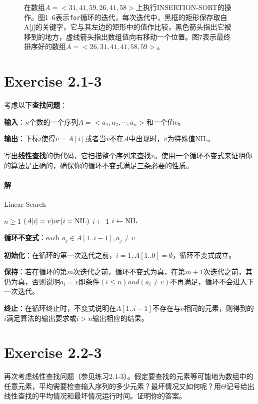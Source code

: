 \documentclass{article}
\begin{document}
\begin{figure}
\caption{在数组$A=<31,41,59,26,41,58>$上执行INSERTION-SORT的操作。图1~6表示\texttt{for}循环的迭代，每次迭代中，黑框的矩形保存取自A[j]的关键字，它与其左边的矩形中的值作比较，黑色箭头指出它被移到的地方，虚线箭头指出数组值向右移动一个位置。图7表示最终排序好的数组$A=<26,31,41,41,58,59>$。}
\label{fig:label}
\end{figure}

\section{Exercise 2.1-3}
考虑以下\textbf{查找问题}：\par
\textbf{输入}：$n$个数的一个序列$A=<a_1,a_2,\cdots,a_n>$和一个值$v$。\par
\textbf{输出}：下标$i$使得$v=A[i]$或者当$v$不在$A$中出现时，$v$为特殊值$\mathrm{NIL}$。\par
写出\textbf{线性查找}的伪代码，它扫描整个序列来查找$v$。使用一个循环不变式来证明你的算法是正确的，确保你的循环不变式满足三条必要的性质。\\
\par
\paragraph{解}
\FloatBarrier
\begin{algorithm}[h]
\caption{Linear Search}
\label{alg1}
\begin{algorithmic}
\REQUIRE $n \geq 1$
\ENSURE $(A[i] = v)or(i = \textnormal{NIL})$
\STATE $i \gets 1$
\ENDWHILE
{}
\STATE $i \gets \textnormal{NIL}$
\ENDIF
\end{algorithmic}
\end{algorithm}

\par
\textbf{循环不变式}：each $a_j \in A[1..i-1], a_j \neq v$ \par
\textbf{初始化}：在循环的第一次迭代之前，$i = 1, A[1..0] = \emptyset$，循环不变式成立。\par
\textbf{保持}：若在循环的第$m$次迭代之前，循环不变式为真，在第$m+1$次迭代之前，其仍为真，否则说明$a_i = v$即条件$(i \leq n ) and ( a_i \neq v)$不再满足，循环不会进入下一次迭代。 \par
\textbf{终止}：在循环终止时，不变式说明在$A[1..i-1]$不存在与$v$相同的元素，则得到的$i$满足算法的输出要求或$i > n$输出相应的结果。

\section{Exercise 2.2-3}
再次考虑线性查找问题（参见练习2.1-3）。假定要查找的元素等可能地为数组中的任意元素，平均需要检查输入序列的多少元素？最坏情况又如何呢？用$\Theta$记号给出线性查找的平均情况和最坏情况运行时间。证明你的答案。\\
\par
\end{document}

